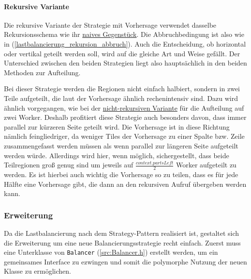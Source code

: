 \paragraph*{Rekursive Variante}
Die rekursive Variante der Strategie mit Vorhersage verwendet dasselbe Rekursionsschema wie ihr \hyperref[lastbalancierung_naiv_rekursion]{naives Gegenstück}.
Die Abbruchbedingung ist also wie in (\ref{lastbalancierung_rekursion_abbruch}).
Auch die Entscheidung, ob horizontal oder vertikal geteilt werden soll, wird auf die gleiche Art und Weise gefällt.
Der Unterschied zwischen den beiden Strategien liegt also hauptsächlich in den beiden Methoden zur Aufteilung.

Bei dieser Strategie werden die Regionen nicht einfach halbiert, sondern in zwei Teile aufgeteilt, die laut der Vorhersage ähnlich rechenintensiv sind.
Dazu wird ähnlich vorgegangen, wie bei der \hyperref[lastbalancierung_vorhersage]{nicht-rekursiven Variante} für die Aufteilung auf zwei Worker.
Deshalb profitiert diese Strategie auch besonders davon, dass immer parallel zur kürzeren Seite geteilt wird.
Die Vorhersage ist in diese Richtung nämlich feingliedriger, da weniger Tiles der Vorhersage zu einer Spalte bzw. Zeile zusammengefasst werden müssen als wenn parallel zur längeren Seite aufgeteilt werden würde.
Allerdings wird hier, wenn möglich, sichergestellt, dass beide Teilregionen groß genug sind um jeweils auf $\frac{context.partsLeft}{2}$ Worker aufgeteilt zu werden.
Es ist hierbei auch wichtig die Vorhersage so zu teilen, dass es für jede Hälfte eine Vorhersage gibt, die dann an den rekursiven Aufruf übergeben werden kann.

\subsubsection{Erweiterung}\label{lastbalancierung_erweiterung}

Da die Lastbalancierung nach dem Strategy-Pattern realisiert ist, gestaltet sich die Erweiterung um eine neue Balancierungsstrategie recht einfach.
Zuerst muss eine Unterklasse von \verb|Balancer| (\autoref{src:Balancer.h}) erstellt werden, um ein gemeinsames Interface zu ezwingen und somit die polymorphe Nutzung der neuen Klasse zu ermöglichen.

\begin{figure}
	
\end{figure}

